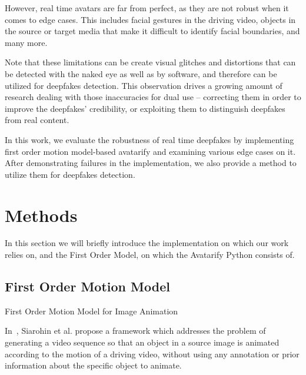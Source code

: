 \documentclass[english,12pt]{article}
\begin{document}
However, real time avatars are far from perfect, as they are not robust when it comes to edge cases.
This includes facial gestures in the driving video, objects in the source or target media that make it
difficult to identify facial boundaries, and many more.


Note that these limitations can be create visual glitches and distortions that can be detected with the
naked eye as well as by software, and therefore can be utilized for deepfakes detection. This observation
drives a growing amount of research dealing with those inaccuracies for dual use -- correcting them in
order to improve the deepfakes' credibility, or exploiting them to distinguish deepfakes from real content.

In this work, we evaluate the robustness of real time deepfakes by implementing first order motion
model-based avatarify and examining various edge cases on it. After demonstrating failures in the
implementation, we also provide a method to utilize them for deepfakes detection.



\section{Methods} \label{methods}

In this section we will briefly introduce the implementation on which our work relies on, and the
First Order Model, on which the Avatarify Python consists of.

\subsection{First Order Motion Model}




First Order Motion Model for Image Animation


In~\cite{DBLP:journals/corr/abs-2003-00196}, Siarohin et al. propose a framework which addresses the problem
of generating a video sequence so that an object in a source image is animated according to the motion of a
driving video, without using any annotation or prior information about the specific object to animate.
\end{document}

